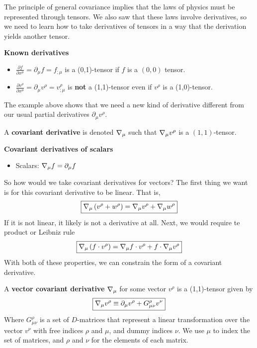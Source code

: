 \documentclass{article}
\begin{document}
 			The principle of general covariance implies that the laws of physics must be represented through tensors. We also saw that these laws involve derivatives, so we need to learn how to take derivatives of tensors in a way that the derivation yields another tensor. 
 			\begin{exmp}
 				\textbf{Known derivatives}
 				\begin{itemize}
 					\item$\frac{\partial f}{\partial x^\mu} = \partial_\mu f = f_{;\mu} $ is a (0,1)-tensor if $f$ is a $(0,0)$ tensor.
 					\item $\frac{\partial v^\rho}{\partial x^\mu} = \partial_\mu v^\rho = v^\rho_{;\mu}$ is \textbf{not} a (1,1)-tensor even if $v^\rho$ is a (1,0)-tensor.
 				\end{itemize}
 			\end{exmp}
 			The example above shows that we need a new kind of derivative different from our usual partial derivatives $\partial_\mu v^\rho$.
 			\begin{defn}
 				A \textbf{covariant derivative} is denoted $\nabla_\mu$ such that
 				$\nabla_\mu v^\rho$ is a $(1,1)$-tensor. 
 			\end{defn}
 		\pagebreak
 			\begin{exmp}
 				\textbf{Covariant derivatives of scalars}
 				\begin{itemize}
 					\item Scalars: $\nabla_\mu f = \partial_\mu f$
 				\end{itemize}
 			\end{exmp}
 			So how would we take covariant derivatives for vectors? The first thing we want is for this covariant derivative to be linear. That is,
 			\begin{equation}
 				\label{eq:LinearLaplace}
 				\boxed{\nabla_\mu \left(v^\rho + w^\rho \right) = \nabla_\mu v^\rho + \nabla_\mu w^\rho}
 			\end{equation}
 			If it is not linear, it likely is not a derivative at all. Next, we would require te product or Leibniz rule
 			\begin{equation}
 				\label{eq:LeibnizRule}
 				\boxed{\nabla_\mu \left(f\cdot v^\rho \right) = \nabla_\mu f \cdot v^{\rho} + f \cdot\nabla_{\mu}  v^{\rho}}
 			\end{equation}
 			With both of these properties, we can constrain the form of a covariant derivative.
 			\begin{defn}
 				A \textbf{vector covariant derivative} $\nabla_\mu$ for some vector $v^\rho$ is a (1,1)-tensor given by
 				\begin{equation}
 					\label{eq:CovariantDerivative}
 					\boxed{\nabla_{\mu}v^{\rho} \equiv \partial_\mu v^\rho + G_{\mu\nu}^\rho v^\nu}
 				\end{equation}
 				Where $G_{\mu\nu}^\rho$ is a set of $D$-matrices that represent a linear transformation over the vector $v^\nu$ with free indices $\rho$ and $\mu$, and dummy indices $\nu$. We use $\mu$ to index the set of matrices, and $\rho$ and $\nu$ for the elements of each matrix.
 			\end{defn}
\end{document}
